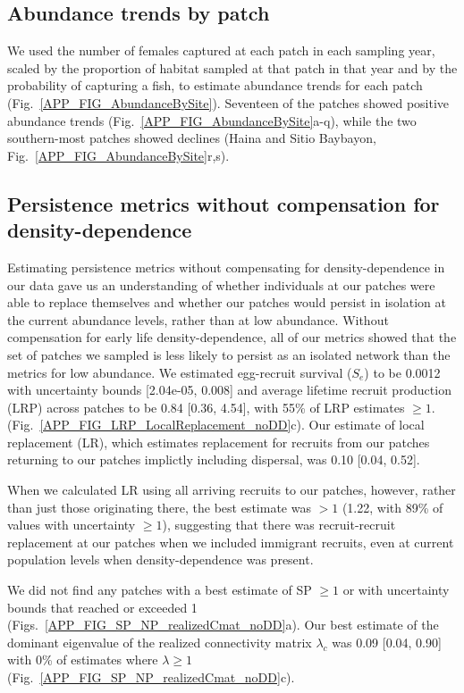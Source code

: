 \documentclass[12pt, oneside]{article}   	%
\begin{document}
\subsection{Abundance trends by patch}

We used the number of females captured at each patch in each sampling year, scaled by the proportion of habitat sampled at that patch in that year and by the probability of capturing a fish, to estimate abundance trends for each patch (Fig.\ \ref{APP_FIG_AbundanceBySite}). Seventeen of the patches showed positive abundance trends (Fig.\ \ref{APP_FIG_AbundanceBySite}a-q), while the two southern-most patches showed declines (Haina and Sitio Baybayon, Fig.\ \ref{APP_FIG_AbundanceBySite}r,s).

\subsection{Persistence metrics without compensation for density-dependence} \label{APP_SEC_RESULTS_noDD} %
Estimating persistence metrics without compensating for density-dependence in our data gave us an understanding of whether individuals at our patches were able to replace themselves and whether our patches would persist in isolation at the current abundance levels, rather than at low abundance. Without compensation for early life density-dependence, all of our metrics showed that the set of patches we sampled is less likely to persist as an isolated network than the metrics for low abundance. We estimated egg-recruit survival ($S_e$) to be 0.0012 with uncertainty bounds [2.04e-05, 0.008] and average lifetime recruit production ($\text{LRP}$) across patches to be 0.84 [0.36, 4.54], with 55\% of LRP estimates $\geq 1$. (Fig.\ \ref{APP_FIG_LRP_LocalReplacement_noDD}c). Our estimate of local replacement (LR), which estimates replacement for recruits from our patches returning to our patches implictly including dispersal, was 0.10 [0.04, 0.52]. 

When we calculated LR using all arriving recruits to our patches, however, rather than just those originating there, the best estimate was $> 1$ (1.22, with 89\% of values with uncertainty $\geq 1$), suggesting that there was recruit-recruit replacement at our patches when we included immigrant recruits, even at current population levels when density-dependence was present.

We did not find any patches with a best estimate of SP $\geq 1$ or with uncertainty bounds that reached or exceeded 1 (Figs.\ \ref{APP_FIG_SP_NP_realizedCmat_noDD}a). Our best estimate of the dominant eigenvalue of the realized connectivity matrix $\lambda_c$ was 0.09 [0.04, 0.90] with 0\% of estimates where $\lambda \geq 1$ (Fig.\ \ref{APP_FIG_SP_NP_realizedCmat_noDD}c). 
\end{document}
